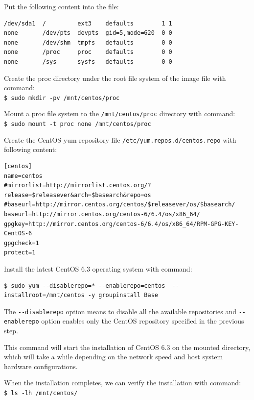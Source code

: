 Put the following content into the file:
\lstset{style=bashstyle}
\begin{lstlisting}
/dev/sda1  /         ext3    defaults        1 1
none       /dev/pts  devpts  gid=5,mode=620  0 0
none       /dev/shm  tmpfs   defaults        0 0
none       /proc     proc    defaults        0 0
none       /sys      sysfs   defaults        0 0
\end{lstlisting}

Create the proc directory under the root file system of the image file with command: \\
\verb|$ sudo mkdir -pv /mnt/centos/proc|

Mount a proc file system to the \verb|/mnt/centos/proc| directory with command: \\
\verb|$ sudo mount -t proc none /mnt/centos/proc|

Create the CentOS yum repository file \verb|/etc/yum.repos.d/centos.repo| with following content:
\lstset{style=bashstyle}
\begin{lstlisting}
[centos]
name=centos
#mirrorlist=http://mirrorlist.centos.org/?release=$releasever&arch=$basearch&repo=os
#baseurl=http://mirror.centos.org/centos/$releasever/os/$basearch/
baseurl=http://mirror.centos.org/centos-6/6.4/os/x86_64/
gpgkey=http://mirror.centos.org/centos-6/6.4/os/x86_64/RPM-GPG-KEY-CentOS-6
gpgcheck=1
protect=1
\end{lstlisting}

Install the latest CentOS 6.3 operating system with command:
\lstset{style=bashstyle}
\begin{lstlisting}
$ sudo yum --disablerepo=* --enablerepo=centos  --installroot=/mnt/centos -y groupinstall Base
\end{lstlisting}

The \verb|--disablerepo| option means to disable all the available repositories and \verb|--enablerepo| option enables only the CentOS repository specified in the previous step.

This command will start the installation of CentOS 6.3 on the mounted directory, which will take a while depending on the network speed and host system hardware configurations.

When the installation completes, we can verify the installation with command:\\
\verb|$ ls -lh /mnt/centos/|

